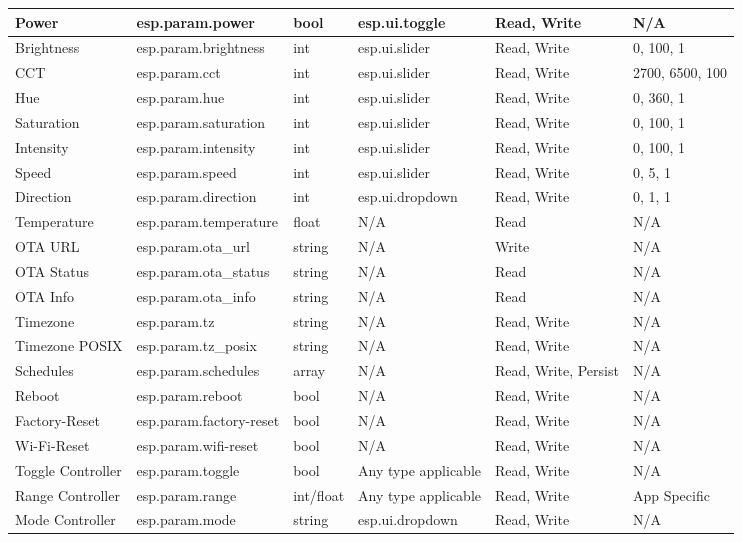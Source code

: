 \documentclass[a4paper,12pt]{book}
\begin{document}
\begin{enumerate}[label=\textbf{(\arabic*)}]
{\begin{longtable}{|>{\RaggedRight}m{}|>{\RaggedRight}m{}|m{}|>{\RaggedRight}m{}|m{}|m{}|}
        Power&esp.param.power&bool&esp.ui.toggle&Read, Write&N/A\\
        \hline
        Brightness&esp.param.brightness&int&esp.ui.slider&Read, Write&0, 100, 1\\
        \hline
        CCT&esp.param.cct&int&esp.ui.slider&Read, Write&2700, 6500, 100\\
        \hline
        Hue&esp.param.hue&int&esp.ui.slider&Read, Write&0, 360, 1\\
        \hline
        Saturation&esp.param.saturation&int&esp.ui.slider&Read, Write&0, 100, 1\\
        \hline
        Intensity&esp.param.intensity&int&esp.ui.slider&Read, Write&0, 100, 1\\
        \hline
        Speed&esp.param.speed&int&esp.ui.slider&Read, Write&0, 5, 1\\
        \hline
        Direction&esp.param.direction&int&esp.ui.dropdown&Read, Write&0, 1, 1\\
        \hline
        Temperature&esp.param.temperature&float&N/A&Read&N/A\\
        \hline
        OTA URL&esp.param.ota\_url&string&N/A&Write&N/A\\
        \hline
        OTA Status&esp.param.ota\_status&string&N/A&Read&N/A\\
        \hline
        OTA Info&esp.param.ota\_info&string&N/A&Read&N/A\\
        \hline
        Timezone&esp.param.tz&string&N/A&Read, Write&N/A\\
        \hline
        Timezone POSIX&esp.param.tz\_posix&string&N/A&Read, Write&N/A\\
        \hline
        Schedules&esp.param.schedules&array&N/A&Read, Write, Persist&N/A\\
        \hline
        Reboot&esp.param.reboot&bool&N/A&Read, Write&N/A\\
        \hline
        Factory-Reset&esp.param.factory-reset&bool&N/A&Read, Write&N/A\\
        \hline
        Wi-Fi-Reset&esp.param.wifi-reset&bool&N/A&Read, Write&N/A\\
        \hline
        Toggle Controller&esp.param.toggle&bool&Any type applicable&Read, Write&N/A\\
        \hline
        Range Controller&esp.param.range&int/float&Any type applicable&Read, Write&App Specific\\
        \hline
        Mode Controller&esp.param.mode&string&esp.ui.dropdown&Read, Write&N/A\\

\end{longtable}}
\end{enumerate}
\end{document}
